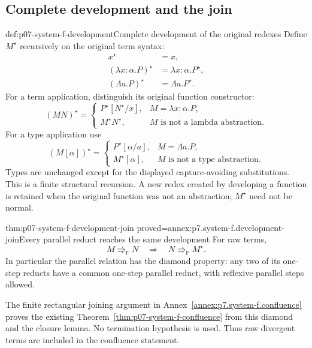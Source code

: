 \subsection{Complete development and the join}
\label{sec:p07-system-f-development}

\begin{hbdefinition}{def:p07-system-f-development}{Complete development of the original redexes}
Define \(M^\star\) recursively on the original term syntax:
\[
\begin{aligned}
 x^\star&=x,\\
 (\lambda x{:}\alpha.P)^\star&=\lambda x{:}\alpha.P^\star,\\
 (\Lambda a.P)^\star&=\Lambda a.P^\star.
\end{aligned}
\]
For a term application, distinguish its original function constructor:
\[
 (MN)^\star=
 \begin{cases}
 P^\star[N^\star/x],&M=\lambda x{:}\alpha.P,\\
 M^\star N^\star,&M\text{ is not a lambda abstraction}.
 \end{cases}
\]
For a type application use
\[
 (M[\alpha])^\star=
 \begin{cases}
 P^\star[\alpha/a],&M=\Lambda a.P,\\
 M^\star[\alpha],&M\text{ is not a type abstraction}.
 \end{cases}
\]
Types are unchanged except for the displayed capture-avoiding substitutions.
This is a finite structural recursion. A new redex created by developing
a function is retained when the original function was not an abstraction;
\(M^\star\) need not be normal.
\end{hbdefinition}

\begin{hbtheorem}{thm:p07-system-f-development-join}
 {proved=annex:p7.system-f.development-join}{Every parallel reduct reaches the same development}
For raw terms,
\[
 M\Rrightarrow_{\mathsf F}N
       \quad\Longrightarrow\quad N\Rrightarrow_{\mathsf F}M^\star.
\]
In particular the parallel relation has the diamond property: any two
of its one-step reducts have a common one-step parallel reduct, with
reflexive parallel steps allowed.
\end{hbtheorem}

The finite rectangular joining argument in
Annex~\ref{annex:p7.system-f.confluence} proves the existing
Theorem~\ref{thm:p07-system-f-confluence} from this diamond and the
closure lemma. No termination hypothesis is used. Thus raw divergent
terms are included in the confluence statement.

